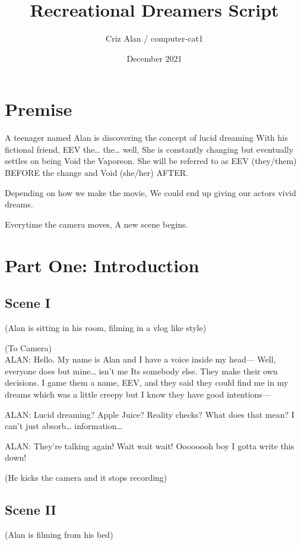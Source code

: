 \documentclass{article}
\title{Recreational Dreamers Script}
\author{Criz Alan / computer-cat1}
\date{December 2021}
\begin{document}
\maketitle
\tableofcontents

\section{Premise}

A teenager named Alan is discovering the concept of lucid dreaming With his fictional friend,
EEV the\ldots{} the\ldots{} well, She is constantly changing but eventually settles on being
Void the Vaporeon. She will be referred to as EEV (they/them) BEFORE the change and Void (she/her) AFTER.

Depending on how we make the movie, We could end up giving our actors vivid dreams.

Everytime the camera moves, A new scene begins. 

\section{Part One: Introduction}
\subsection[001 - I]{Scene I}

(Alan is sitting in his room, filming in a vlog like style)

\noindent
(To Camera)\\
ALAN: Hello. My name is Alan and I have a voice inside my head--- Well, everyone does but mine\ldots{} isn't me
Its somebody else. They make their own decisions. I game them a name, EEV, and they said they could find me in my dreams
which was a little creepy but I know they have good intentions---

\noindent
ALAN: Lucid dreaming? Apple Juice? Reality checks? What does that mean? I can't just absorb\ldots{} information\ldots{}

\noindent
ALAN: They're talking again! Wait wait wait! Oooooooh boy I gotta write this down!

\noindent
(He kicks the camera and it stops recording)

\subsection[002 - II]{Scene II}

(Alan is filming from his bed)
\end{document}
